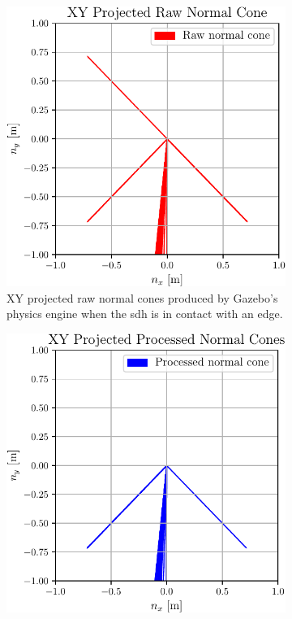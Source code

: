 \begin{figure}[!h]
	\centering
	\begin{subfigure}[b]{0.48\textwidth}
		\centering
		\includegraphics[width=\textwidth]{chapters/1-tactile-perception/fig/matplotlib/xy-projected-raw-normal-cones.pdf}
		\caption{XY projected raw normal cones produced by Gazebo's physics engine when the \gls{sdh} is in contact with an edge.}
		\label{fig:xy-projected-raw-normal-cones}
	\end{subfigure}
	\hfill
	\begin{subfigure}[b]{0.48\textwidth}
		\centering
		\includegraphics[width=\textwidth]{chapters/1-tactile-perception/fig/matplotlib/xy-projected-processed-normal-cones.pdf}

\end{subfigure}
\end{figure}
